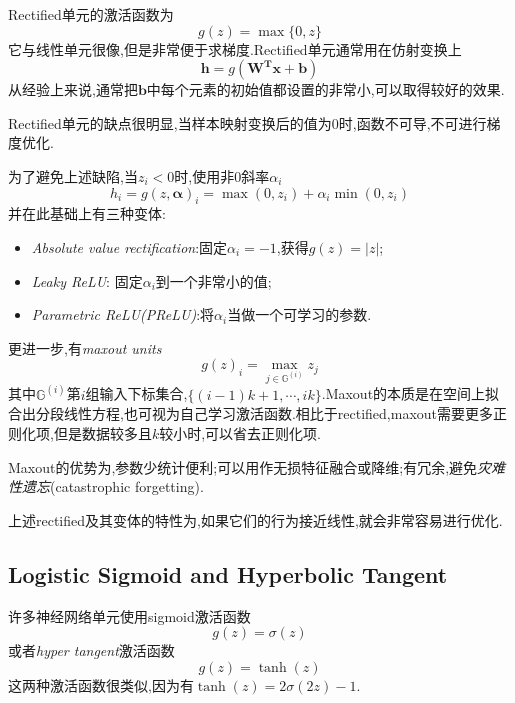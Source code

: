 Rectified单元的激活函数为
\begin{equation}
g(z)=\max\{0,z\}
\end{equation}
它与线性单元很像,但是非常便于求梯度.Rectified单元通常用在仿射变换上
\begin{equation}
\mathbf h=g(\mathbf{W^Tx+b})
\end{equation}
从经验上来说,通常把$\mathbf b$中每个元素的初始值都设置的非常小,可以取得较好的效果.

Rectified单元的缺点很明显,当样本映射变换后的值为$0$时,函数不可导,不可进行梯度优化.

为了避免上述缺陷,当$z_i<0$时,使用非$0$斜率$\alpha_i$
\begin{equation}
h_i=g(z,\mathbf\alpha)_i=\max(0,z_i)+\alpha_i\min(0,z_i)
\end{equation}
并在此基础上有三种变体:
\begin{itemize}
\item \textit{Absolute value rectification}:固定$\alpha_i=-1$,获得$g(z)=|z|$;
\item \textit{Leaky ReLU}: 固定$\alpha_i$到一个非常小的值;
\item \textit{Parametric ReLU(PReLU)}:将$\alpha_i$当做一个可学习的参数.
\end{itemize}

更进一步,有\textit{maxout units}
\begin{equation}
g(z)_i=\max_{j\in\mathbb G^{(i)}}z_j
\end{equation}
其中$\mathbb G^{(i)}$第$i$组输入下标集合,$\{(i-1)k+1,\cdots,ik\}$.Maxout的本质是在空间上拟合出分段线性方程,也可视为自己学习激活函数.相比于rectified,maxout需要更多正则化项,但是数据较多且$k$较小时,可以省去正则化项.

Maxout的优势为,参数少统计便利;可以用作无损特征融合或降维;有冗余,避免\textit{灾难性遗忘}(catastrophic forgetting).

上述rectified及其变体的特性为,如果它们的行为接近线性,就会非常容易进行优化.

\subsection{Logistic Sigmoid and Hyperbolic Tangent}

许多神经网络单元使用sigmoid激活函数
\begin{equation}
g(z)=\sigma(z)
\end{equation}
或者\textit{hyper tangent}激活函数
\begin{equation}
g(z)=\tanh(z)
\end{equation}
这两种激活函数很类似,因为有$\tanh(z)=2\sigma(2z)-1$.

